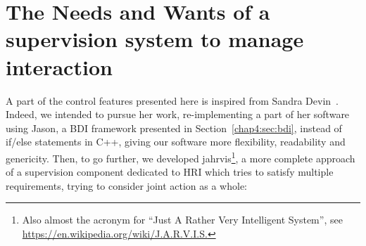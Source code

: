 \documentclass[a4paper,11pt,twoside]{StyleThese}
\begin{document}
\section{The Needs and Wants of a supervision system to manage interaction} %


A part of the control features presented here is inspired from Sandra Devin~\cite{devin_2017_decisional}. Indeed, we intended to pursue her work, re-implementing a part of her software using Jason, a BDI framework presented in Section~\ref{chap4:sec:bdi}, instead of if/else statements in C++, giving our software more flexibility, readability and genericity.
Then, to go further, we developed \acrfull{jahrvis}\footnote{Also almost the acronym for ``Just A Rather Very Intelligent System'', see \url{https://en.wikipedia.org/wiki/J.A.R.V.I.S.}}, a more complete approach of a supervision component dedicated to HRI which tries to satisfy multiple requirements, trying to consider joint action as a whole:
\end{document}
